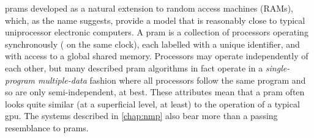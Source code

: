 \Glspl{pram} developed as a natural extension to random access machines (RAMs), which, as the name suggests, provide a model that is reasonably close to typical uniprocessor electronic computers.  A \gls{pram} is a collection of processors operating synchronously (\ie{} on the same clock), each labelled with a unique identifier, and with access to a global shared memory.  Processors may operate independently of each other, but many described \gls{pram} algorithms in fact operate in a \emph{single-program multiple-data} fashion where all processors follow the same program and so are only semi-independent, at best.  These attributes mean that a \gls{pram} often looks quite similar (at a superficial level, at least) to the operation of a typical \gls{gpu}.  The systems described in \cref{chap:nmp} also bear more than a passing resemblance to \glspl{pram}.

